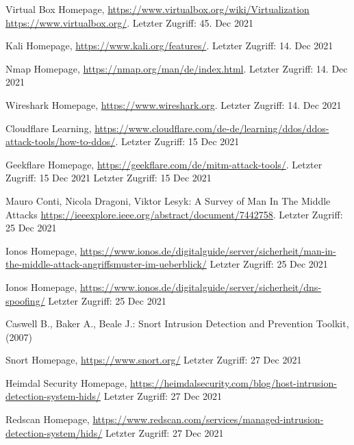 \begin{thebibliography}{8}
Virtual Box Homepage, \url{https://www.virtualbox.org/wiki/Virtualization} \url{https://www.virtualbox.org/}. Letzter Zugriff: 45. Dec 2021

Kali Homepage, \url{https://www.kali.org/features/}. Letzter Zugriff: 14. Dec 2021

Nmap Homepage, \url{https://nmap.org/man/de/index.html}. Letzter Zugriff: 14. Dec 2021

Wireshark Homepage, \url{https://www.wireshark.org}. Letzter Zugriff: 14. Dec 2021

Cloudflare Learning, \url{ https://www.cloudflare.com/de-de/learning/ddos/ddos-attack-tools/how-to-ddos/}. Letzter Zugriff: 15 Dec 2021

Geekflare Homepage, \url{https://geekflare.com/de/mitm-attack-tools/}. Letzter Zugriff: 15 Dec 2021 Letzter Zugriff: 15 Dec 2021

Mauro Conti, Nicola Dragoni, Viktor Lesyk: A Survey of Man In The Middle Attacks \url{https://ieeexplore.ieee.org/abstract/document/7442758}. Letzter Zugriff: 25 Dec 2021

Ionos Homepage, \url{https://www.ionos.de/digitalguide/server/sicherheit/man-in-the-middle-attack-angriffsmuster-im-ueberblick/} Letzter Zugriff: 25 Dec 2021

Ionos Homepage, \url{https://www.ionos.de/digitalguide/server/sicherheit/dns-spoofing/} Letzter Zugriff: 25 Dec 2021

Caswell B., Baker A., Beale J.: Snort Intrusion Detection and Prevention Toolkit,
(2007)

Snort Homepage, \url{https://www.snort.org/} Letzter Zugriff: 27 Dec 2021

Heimdal Security Homepage, \url{https://heimdalsecurity.com/blog/host-intrusion-detection-system-hids/} Letzter Zugriff: 27 Dec 2021

Redscan Homepage, \url{https://www.redscan.com/services/managed-intrusion-detection-system/hids/} Letzter Zugriff: 27 Dec 2021








\end{thebibliography}
